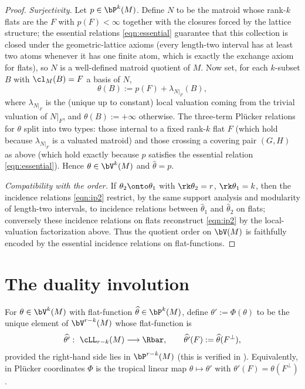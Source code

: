 \begin{proof}
\emph{Surjectivity.}
Let $p\in\bP^k(M)$. Define $N$ to be the matroid whose rank-$k$ flats are the
$F$ with $p(F)<\infty$ together with the closures forced by the lattice
structure; the essential relations \eqref{eqn:essential} guarantee that this
collection is closed under the geometric-lattice axioms (every length-two
interval has at least two atoms whenever it has one finite atom, which is exactly
the exchange axiom for flats), so $N$ is a well-defined matroid quotient of $M$.
Now set, for each $k$-subset $B$ with $\cl_M(B)=F$ a basis of $N$,
\[
\theta(B):=p(F)+\lambda_{N|_F}(B),
\]
where $\lambda_{N|_F}$ is the (unique up to constant) local valuation coming from
the trivial valuation of $N|_F$, and $\theta(B):=+\infty$ otherwise. The
three-term Pl\"ucker relations for $\theta$ split into two types: those internal
to a fixed rank-$k$ flat $F$ (which hold because $\lambda_{N|_F}$ is a valuated
matroid) and those crossing a covering pair $(G,H)$ as above (which hold exactly
because $p$ satisfies the essential relation \eqref{eqn:essential}). Hence
$\theta\in\bV^k(M)$ and $\widehat\theta=p$.

\emph{Compatibility with the order.}
If $\theta_2\onto\theta_1$ with $\rk\theta_2=r$, $\rk\theta_1=k$, then the
incidence relations \eqref{eqn:ip2} restrict, by the same support analysis and
modularity of length-two intervals, to incidence relations between
$\widehat\theta_1$ and $\widehat\theta_2$ on flats; conversely these incidence
relations on flats reconstruct \eqref{eqn:ip2} by the local-valuation
factorization above. Thus the quotient order on $\bV(M)$ is faithfully encoded by
the essential incidence relations on flat-functions.
\end{proof}

\section{The duality involution}


\begin{definition}\label{def:Phi}
For $\theta\in\bV^k(M)$ with flat-function $\widehat\theta\in\bP^k(M)$, define
$\theta':=\Phi(\theta)$ to be the unique element of $\bV^{r-k}(M)$ whose
flat-function is
\[
\widehat{\theta'}:\ \cLL_{r-k}(M)\longrightarrow\Rbar,\qquad
\widehat{\theta'}(F):=\widehat\theta(F^\perp),
\]
provided the right-hand side lies in $\bP^{r-k}(M)$ (this is verified in
). Equivalently, in Pl\"ucker coordinates $\Phi$ is the tropical
linear map $\theta\mapsto\theta'$ with $\theta'(F)=\theta(F^\perp)$.
\end{definition}

